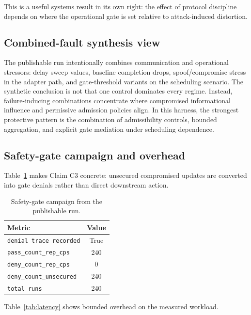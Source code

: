 \documentclass[11pt]{article}
\newcommand{\field}[1]{\texttt{#1}}
\begin{document}
This is a useful systems result in its own right: the effect of protocol discipline depends on where the operational gate is set relative to attack-induced distortion.

\subsection{Combined-fault synthesis view}

The publishable run intentionally combines communication and operational stressors: delay sweep values, baseline completion drops, spoof/compromise stress in the adapter path, and gate-threshold variants on the scheduling scenario. The synthetic conclusion is not that one control dominates every regime. Instead, failure-inducing combinations concentrate where compromised informational influence and permissive admission policies align. In this harness, the strongest protective pattern is the combination of admissibility controls, bounded aggregation, and explicit gate mediation under scheduling dependence.

\subsection{Safety-gate campaign and overhead}

Table~\ref{tab:safety} makes Claim C3 concrete: unsecured compromised updates are converted into gate denials rather than direct downstream action.

\begin{table}[H]
\centering
\caption{Safety-gate campaign from the publishable run.}
\label{tab:safety}
\begin{tabular}{lc}
\toprule
Metric & Value \\
\midrule
\field{denial\_trace\_recorded} & True \\
\field{pass\_count\_rep\_cps} & 240 \\
\field{deny\_count\_rep\_cps} & 0 \\
\field{deny\_count\_unsecured} & 240 \\
\field{total\_runs} & 240 \\
\bottomrule
\end{tabular}
\end{table}

Table~\ref{tab:latency} shows bounded overhead on the measured workload.
\end{document}
